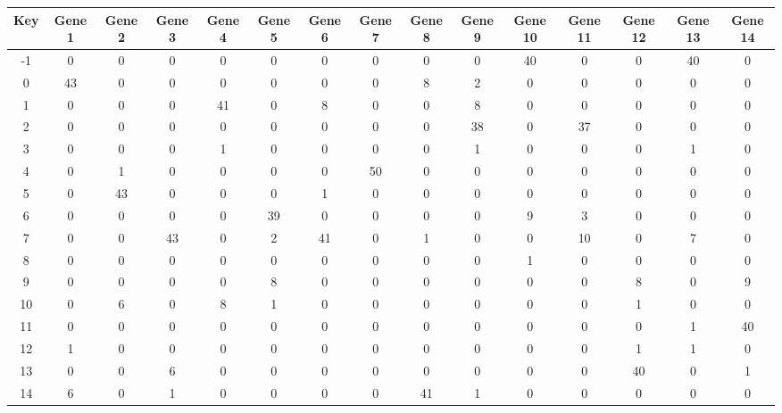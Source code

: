 \begin{tabular}{|c|c|c|c|c|c|c|c|c|c|c|c|c|c|c|}
\hline
Key & Gene 1 & Gene 2 & Gene 3 & Gene 4 & Gene 5 & Gene 6 & Gene 7 & Gene 8 & Gene 9 & Gene 10 & Gene 11 & Gene 12 & Gene 13 & Gene 14 \\
\hline
-1 & 0 & 0 & 0 & 0 & 0 & 0 & 0 & 0 & 0 & 40 & 0 & 0 & 40 & 0 \\
0 & 43 & 0 & 0 & 0 & 0 & 0 & 0 & 8 & 2 & 0 & 0 & 0 & 0 & 0 \\
1 & 0 & 0 & 0 & 41 & 0 & 8 & 0 & 0 & 8 & 0 & 0 & 0 & 0 & 0 \\
2 & 0 & 0 & 0 & 0 & 0 & 0 & 0 & 0 & 38 & 0 & 37 & 0 & 0 & 0 \\
3 & 0 & 0 & 0 & 1 & 0 & 0 & 0 & 0 & 1 & 0 & 0 & 0 & 1 & 0 \\
4 & 0 & 1 & 0 & 0 & 0 & 0 & 50 & 0 & 0 & 0 & 0 & 0 & 0 & 0 \\
5 & 0 & 43 & 0 & 0 & 0 & 1 & 0 & 0 & 0 & 0 & 0 & 0 & 0 & 0 \\
6 & 0 & 0 & 0 & 0 & 39 & 0 & 0 & 0 & 0 & 9 & 3 & 0 & 0 & 0 \\
7 & 0 & 0 & 43 & 0 & 2 & 41 & 0 & 1 & 0 & 0 & 10 & 0 & 7 & 0 \\
8 & 0 & 0 & 0 & 0 & 0 & 0 & 0 & 0 & 0 & 1 & 0 & 0 & 0 & 0 \\
9 & 0 & 0 & 0 & 0 & 8 & 0 & 0 & 0 & 0 & 0 & 0 & 8 & 0 & 9 \\
10 & 0 & 6 & 0 & 8 & 1 & 0 & 0 & 0 & 0 & 0 & 0 & 1 & 0 & 0 \\
11 & 0 & 0 & 0 & 0 & 0 & 0 & 0 & 0 & 0 & 0 & 0 & 0 & 1 & 40 \\
12 & 1 & 0 & 0 & 0 & 0 & 0 & 0 & 0 & 0 & 0 & 0 & 1 & 1 & 0 \\
13 & 0 & 0 & 6 & 0 & 0 & 0 & 0 & 0 & 0 & 0 & 0 & 40 & 0 & 1 \\
14 & 6 & 0 & 1 & 0 & 0 & 0 & 0 & 41 & 1 & 0 & 0 & 0 & 0 & 0 \\
\hline
\end{tabular}